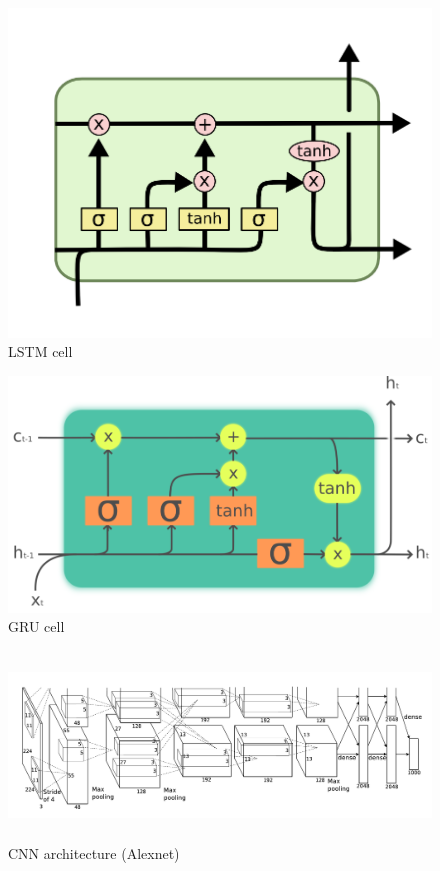 \documentclass[letterpaper, 12 pt, conference]{ieeeconf}  %
\begin{document}
\begin{figure}[!h]
\centering
\includegraphics[scale=0.5]{../figs/lstm.png}	
\caption{LSTM cell}
\label{fig:LSTM} 
\end{figure}

\begin{figure}[!h]
\centering
\includegraphics[scale=0.8]{../figs/gru.png}	
\caption{GRU cell}
\label{fig:GRU} 
\end{figure}


\begin{figure}[!h]
\centering
\includegraphics[width=\textwidth,height=5cm]{../figs/cnn.png}	
\caption{CNN architecture (Alexnet)}
\label{fig:CNN} 
\end{figure}
\end{document}
